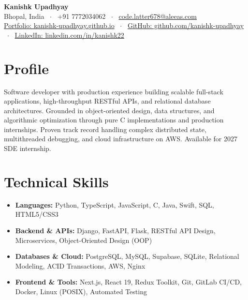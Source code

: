 \documentclass[10pt,a4paper]{article}
\begin{document}
\begin{center}
    {\huge \textbf{Kanishk Upadhyay}} \\ \vspace{2pt}
    Bhopal, India \ $\cdot$ \ +91 7772034062 \ $\cdot$ \ \href{mailto:code.latter678@aleeas.com}{code.latter678@aleeas.com} \\ \vspace{2pt}
    \href{https://kanishk-upadhyay.github.io/}{Portfolio: kanishk-upadhyay.github.io} \ $\cdot$ \ 
    \href{https://github.com/kanishk-upadhyay}{GitHub: github.com/kanishk-upadhyay} \ $\cdot$ \ 
    \href{https://linkedin.com/in/kanishk22}{LinkedIn: linkedin.com/in/kanishk22}
\end{center}

\vspace{-6pt}
\section{Profile}
Software developer with production experience building scalable full-stack applications, high-throughput RESTful APIs, and relational database architectures. Grounded in object-oriented design, data structures, and algorithmic optimization through pure C implementations and production internships. Proven track record handling complex distributed state, multithreaded debugging, and cloud infrastructure on AWS. Available for 2027 SDE internship.

\section{Technical Skills}
\begin{itemize}
    \item \textbf{Languages:} Python, TypeScript, JavaScript, C, Java, Swift, SQL, HTML5/CSS3
    \item \textbf{Backend \& APIs:} Django, FastAPI, Flask, RESTful API Design, Microservices, Object-Oriented Design (OOP)
    \item \textbf{Databases \& Cloud:} PostgreSQL, MySQL, Supabase, SQLite, Relational Modeling, ACID Transactions, AWS, Nginx
    \item \textbf{Frontend \& Tools:} Next.js, React 19, Redux Toolkit, Git, GitLab CI/CD, Docker, Linux (POSIX), Automated Testing
\end{itemize}
\end{document}
